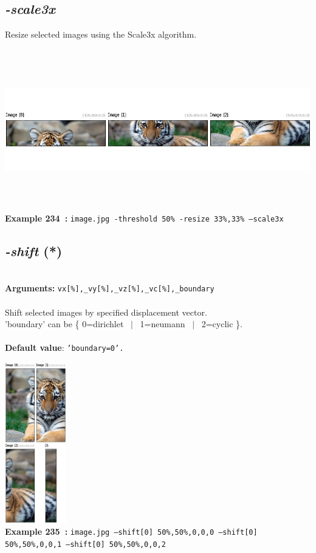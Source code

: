 \documentclass[a4paper,11pt,twoside]{book}
\begin{document}
\subsection{\emph{-scale3x} }\vspace*{-0.5em}
Resize selected images using the Scale3x algorithm.
\begin{center}\includegraphics[keepaspectratio=true,height=7cm,width=\textwidth]{img/gmic_def234.jpg}\\
{\footnotesize \textbf{Example 234~:} \texttt{image.jpg -threshold 50\% -resize 33\%,33\% --scale3x}}
\end{center}

\subsection{\emph{-shift} (*)}\vspace*{-0.5em}
~\\\textbf{Arguments: } 
{\small \texttt{vx[\%],\_vy[\%],\_vz[\%],\_vc[\%],\_boundary}}\\~\\
Shift selected images by specified displacement vector.
~\\'boundary' can be \{ 0=dirichlet ~$|$~ 1=neumann ~$|$~ 2=cyclic \}.
~\\~\\\textbf{Default value}: {\small \texttt{'boundary=0'.}}
\begin{center}\includegraphics[keepaspectratio=true,height=7cm,width=\textwidth]{img/gmic_def235.jpg}\\
{\footnotesize \textbf{Example 235~:} \texttt{image.jpg --shift[0] 50\%,50\%,0,0,0 --shift[0] 50\%,50\%,0,0,1 --shift[0] 50\%,50\%,0,0,2}}
\end{center}
\end{document}
